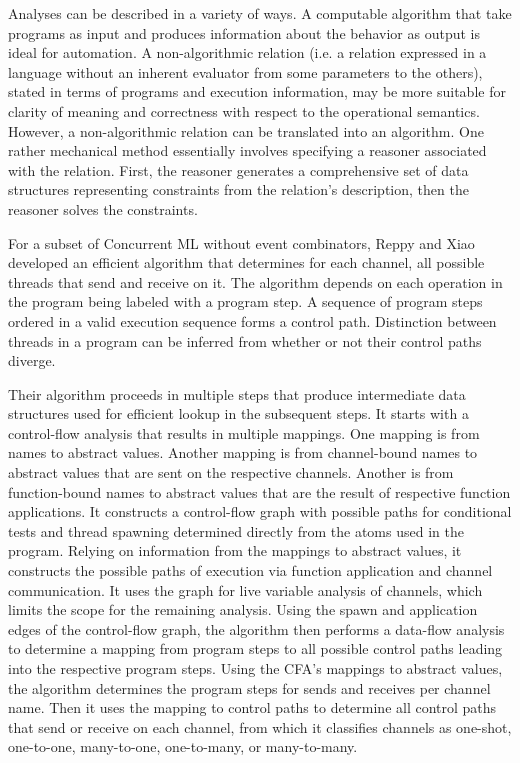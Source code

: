 \documentclass[letterpaper, 11pt]{extarticle}
\begin{document}
Analyses can be described in a variety of ways. A computable algorithm that take programs
as input and produces information about the behavior as output is ideal for automation. A
non-algorithmic relation (i.e. a relation expressed in a language without an inherent evaluator
from some parameters to the others),
stated in terms of programs and execution information, may be
more suitable for clarity of meaning and correctness with respect to the operational
semantics. However, a non-algorithmic relation can be translated into an algorithm.
One rather mechanical method essentially involves
specifying a reasoner associated with the relation. 
First, the reasoner generates a comprehensive set of data structures representing
constraints from the relation's description, then the reasoner solves the constraints.

For a subset of Concurrent ML without event combinators, Reppy and Xiao developed an
efficient algorithm that determines for each channel, all possible threads that send
and receive on it. The algorithm depends on each operation in the program being
labeled with a program step. A sequence of program steps ordered in a valid execution
sequence forms a control path. Distinction between threads in a program can be inferred from
whether or not their control paths diverge.  

Their algorithm proceeds in multiple steps that produce intermediate data structures used for
efficient lookup in the subsequent steps. It starts with a control-flow analysis that
results in multiple mappings. One mapping is from names to abstract values.
Another mapping is from channel-bound names to abstract values that are
sent on the respective channels. Another is from function-bound names to abstract values
that are the result of respective function applications.  It constructs a control-flow graph 
with possible paths for conditional tests and thread spawning determined directly from the
atoms used in the program. Relying on information from the mappings to abstract values,
it constructs the possible paths of execution via function application and channel
communication.  It uses the graph for live variable analysis of channels, which limits the
scope for the remaining analysis.  Using the spawn and application edges of the control-flow
graph, the algorithm then performs a data-flow analysis to determine a mapping from program
steps to all possible control paths leading into the respective program steps.  Using the
CFA's mappings to abstract values, the algorithm determines the program steps for sends and
receives per channel name.  Then it uses the mapping to control paths to determine all
control paths that send or receive on each channel, from which it classifies channels as
one-shot, one-to-one, many-to-one, one-to-many, or many-to-many.
\end{document}
